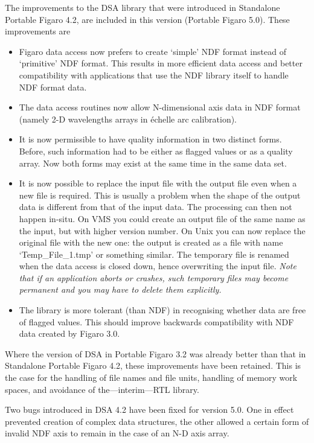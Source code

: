 \documentclass[11pt,twoside]{article}
\newcommand{\latorhtm}[2]{#1}
\newcommand{\latorhtm}[2]{#2}
\begin{document}
   The improvements to the DSA library that were introduced in
   Standalone Portable Figaro 4.2, are included in this version
   (Portable Figaro 5.0). These improvements are

\begin{itemize}
\item Figaro data access now prefers to create `simple' NDF format
   instead of `primitive' NDF format. This results in more efficient
   data access and better compatibility with applications that use the
   NDF library itself to handle NDF format data.
\item The data access routines now allow N-dimensional axis data in NDF
   format (namely 2-D wavelengths arrays in \'echelle arc calibration).
\item It is now permissible to have quality information in two distinct
   forms. Before, such information had to be either as flagged values or
   as a quality array. Now both forms may exist at the same time in the
   same data set.
\item It is now possible to replace the input file with the output file
   even when a new file is required. This is usually a problem when the
   shape of the output data is different from that of the input data.
   The processing can then not happen in-situ. On VMS you could create
   an output file of the same name as the input, but with higher
   version number. On Unix you can now replace the original file with
   the new one: the output is created as a file with name `Temp\_File\_1.tmp'
   or something similar. The temporary file is renamed when the data access
   is closed down, hence overwriting the input file. {\em Note that if
   an application aborts or crashes, such temporary files may become
   permanent and you may have to delete them explicitly.}
\item The library is more tolerant (than NDF) in recognising whether
   data are free of flagged values. This should improve
   backwards compatibility with NDF data created by Figaro 3.0.
\end{itemize}

   Where the version of DSA in Portable Figaro 3.2 was already better
   than that in Standalone Portable Figaro 4.2, these improvements have
   been retained. This is the case for the handling of file names and
   file units, handling of memory work spaces, and avoidance of
   the\latorhtm{---}{-}interim\latorhtm{---}{-}RTL library.

   Two bugs introduced
   in DSA 4.2 have been fixed for version 5.0. One in effect
   prevented creation of complex data structures, the other allowed a
   certain form of invalid NDF axis to remain in the case of an N-D axis
   array.
\end{document}

